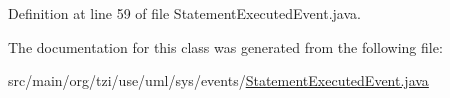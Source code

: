 Definition at line 59 of file Statement\-Executed\-Event.\-java.



The documentation for this class was generated from the following file\-:\begin{DoxyCompactItemize}
\item 
src/main/org/tzi/use/uml/sys/events/\hyperlink{_statement_executed_event_8java}{Statement\-Executed\-Event.\-java}\end{DoxyCompactItemize}
